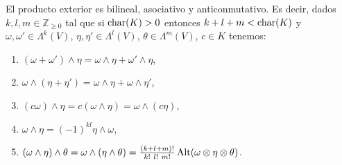 \begin{pro}\label{pebya}
El producto exterior es bilineal, asociativo y  anticonmutativo. Es decir, dados $k,l,m\in\mathbb{Z}_{\ge 0}$ tal que si $\operatorname{char}(K)>0$ entonces $k+l+m<\operatorname{char}(K)$ y $\omega,\omega'\in\Lambda^k(V)$, $\eta,\eta'\in\Lambda^l(V)$, $\theta\in\Lambda^m(V)$, $c\in K$ tenemos:
\begin{enumerate}
\item $(\omega+\omega')\wedge\eta=\omega\wedge\eta+\omega'\wedge\eta$,
\item $\omega\wedge(\eta+\eta')=\omega\wedge\eta+\omega\wedge\eta'$,
\item $(c\omega)\wedge\eta=c(\omega\wedge\eta)=\omega\wedge(c\eta)$,
\item $\omega\wedge\eta=(-1)^{kl}\eta\wedge\omega$,
\item $(\omega\wedge\eta)\wedge\theta=\omega\wedge(\eta\wedge\theta)=\frac{(k+l+m)!}{k!\ l!\ m!}\Alt(\omega\otimes\eta\otimes\theta)$.
\end{enumerate}
\end{pro}

